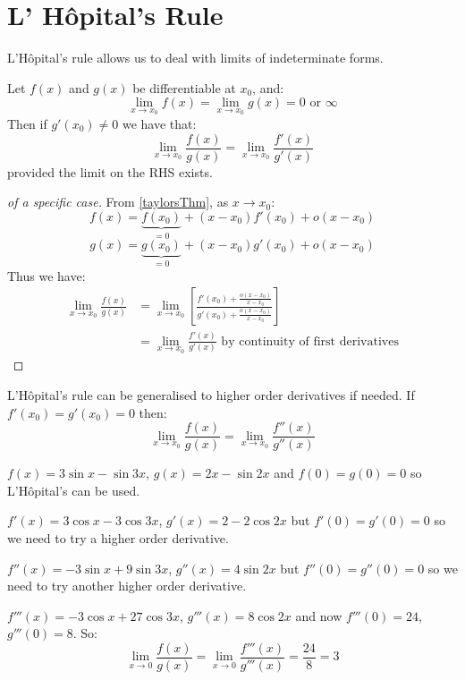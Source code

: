 \documentclass[../main.tex]{subfiles}
\begin{document}
\section{L' H\^opital's Rule}
L'H\^opital's rule allows us to deal with limits of indeterminate forms.
\begin{theorem}
  Let $f(x)$ and $g(x)$ be differentiable at $x_0$, and:
  \[
    \lim_{x \to x_0} f(x) = \lim_{x \to x_0} g(x) = 0 \text{ or } \infty
  \]
  Then if $g'(x_0) \neq 0$ we have that:
  \[
    \lim_{x \to x_0} \frac{f(x)}{g(x)} = \lim_{x \to x_0} \frac{f'(x)}{g'(x)}
  \]
  provided the limit on the RHS exists.
\end{theorem}
\begin{proof}[of a specific case]
  From \cref{taylorsThm}, as $x \to x_0$:
  \[
    f(x) = \underbrace{f(x_0)}_{=0} + (x - x_0)f'(x_0) + o(x - x_0)
  \]
  \[
    g(x) = \underbrace{g(x_0)}_{=0} + (x - x_0)g'(x_0) + o(x - x_0)
  \]
  Thus we have:
  \begin{align*}
    \lim_{x \to x_0} \frac{f(x)}{g(x)} &= \lim_{x \to x_0} \left[\frac{f'(x_0) + \frac{o(x-x_0)}{x-x_0}}{g'(x_0) + \frac{o(x-x_0)}{x-x_0}}\right] \\
                                       &= \lim_{x \to x_0} \frac{f'(x)}{g'(x)} \text{ by continuity of first derivatives}
  \end{align*}
\end{proof}
L'H\^opital's rule can be generalised to higher order derivatives if needed.
If $f'(x_0) = g'(x_0) = 0$ then:
\[
  \lim_{x \to x_0} \frac{f(x)}{g(x)} = \lim_{x \to x_0} \frac{f''(x)}{g''(x)}
\]
\begin{example}
  $f(x) = 3\sin x - \sin 3x$, $g(x) = 2x - \sin 2x$ and $f(0) = g(0) = 0$ so L'H\^opital's can be used.

  $f'(x) = 3\cos x - 3\cos3x$, $g'(x) = 2 - 2\cos2x$ but $f'(0) = g'(0) = 0$ so we need to try a higher order derivative.

  $f''(x) = -3\sin x + 9\sin3x$, $g''(x) = 4\sin2x$ but $f''(0) = g''(0) = 0$ so we need to try another higher order derivative.

  $f'''(x) = -3\cos x + 27\cos3x$, $g'''(x) = 8\cos2x$ and now $f'''(0) = 24$, $g'''(0) = 8$.
  So:
  \[
    \lim_{x \to 0} \frac{f(x)}{g(x)} = \lim_{x \to 0} \frac{f'''(x)}{g'''(x)} = \frac{24}{8} = 3
  \]
\end{example}
\end{document}
